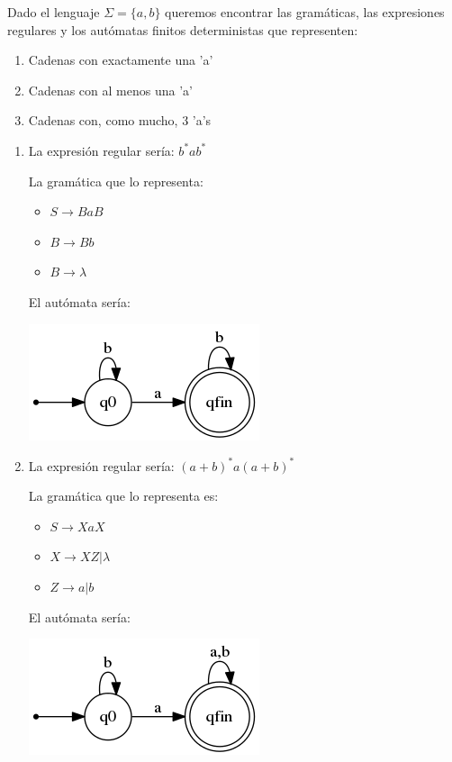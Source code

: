 \begin{problem}
Dado el lenguaje $\Sigma = \lbrace a,b \rbrace$ queremos encontrar las gramáticas, las expresiones regulares y los autómatas finitos deterministas que representen:
\begin{enumerate}
\item Cadenas con exactamente una 'a'
\item Cadenas con al menos una 'a'
\item Cadenas con, como mucho, 3 'a's
\end{enumerate}
\solution

\begin{enumerate}
\item 
La expresión regular sería: $b^*a b^*$

La gramática que lo representa:

\begin{itemize}
\item $S \rightarrow BaB$
\item $B \rightarrow Bb$
\item $B \rightarrow \lambda$
\end{itemize}

El autómata sería:
\begin{center}
\includegraphics[scale=0.75]{tex/automata1.png}
\end{center}

\item 
La expresión regular sería: $(a+b)^* a (a+b)^* $

La gramática que lo representa es:
\begin{itemize}
\item $S \rightarrow XaX$
\item $X \rightarrow XZ | \lambda$
\item $Z \rightarrow a | b$
\end{itemize}

El autómata sería:
\begin{center}
\includegraphics[scale=0.75]{tex/automata2.png}
\end{center}


\end{enumerate}
\end{problem}
